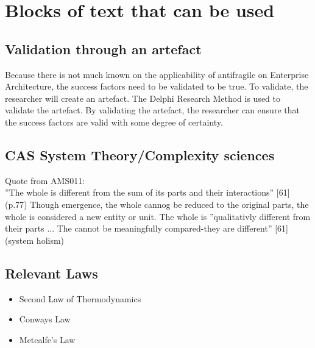 \chapter{Blocks of text that can be used}

\section{Validation through an artefact}
Because there is not much known on the applicability of antifragile on Enterprise Architecture, the success factors need to be validated to be true. To validate, the researcher will create an artefact. The Delphi Research Method is used to validate the artefact. By validating the artefact, the researcher can ensure that the success factors are valid with some degree of certainty.\\

\section{CAS System Theory/Complexity sciences}
Quote from AMS011:\\
''The whole is different from the sum of its parts and their interactions'' [61] (p.77) Though emergence, the whole cannog be reduced to the original parts, the whole is considered a new entity or unit. The whole is ''qualitativly different from their parts ... The cannot be meaningfully compared-they are different'' [61] (system holism)

\section{Relevant Laws}
\begin{itemize}
	\item{Second Law of Thermodynamics}
	\item{Conways Law}
	\item{Metcalfe's Law}
\end{itemize}
